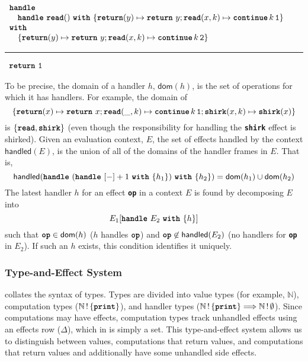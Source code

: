\begin{eff}
$\begin{array}{l}
  \textbf{\texttt{handle}} \\
  \quad \handleWith{\textbf{\texttt{read}}()}{\returnHandler{y}{\return{y}}; \textbf{\texttt{read}}(x, k) \mapsto {\continue{k}{\texttt{1}}}} \\
  \textbf{\texttt{with}} \\ 
  \quad \{ \returnHandler{y}{\return{y}}; \textbf{\texttt{read}}(x, k) \mapsto {\continue{k}{\texttt{2}}} \}
\end{array}$ 

\vspace{2mm} 
\textcolor{effComment}{\hrule height 0.2mm \relax}
\vspace{2mm} 

\textcolor{effComment}{$\begin{array}{l}\return{\texttt{1}}\end{array}$}
\end{eff}

To be precise, the domain of a handler $h$, $\textsf{dom}(h)$, is the set of operations for which it has handlers. For example, the domain of 
\[\{ \returnHandler{x}{\return{x}}; \textbf{\texttt{read}}(\_, k) \mapsto \continue{k}{\texttt{1}}; \textbf{\texttt{shirk}}(x, k) \mapsto \textbf{\texttt{shirk}}(x)
\} \] 
is $\{ \textbf{\texttt{read}}, \textbf{\texttt{shirk}} \}$ (even though the responsibility for handling the \textbf{\texttt{shirk}} effect is shirked).
Given an evaluation context, $E$, the set of effects handled by the context $\textsf{handled}(E)$, is the union of all of the domains of the handler frames in $E$. That is, 
\[\textsf{handled}(\handleWith{(\handleWith{[-]+1}{h_1})}{h_2}) = \textsf{dom}(h_1) \cup \textsf{dom}(h_2)\]
The latest handler $h$ for an effect \textbf{\texttt{op}} in a context $E$ is found by decomposing $E$ into 
\[E_1[\handleWith{E_2}{h}]\]
such that $\textbf{\texttt{op}} \in \textsf{dom}(h)$ ($h$ handles $\textbf{\texttt{op}}$) and $\textbf{\texttt{op}} \not\in \textsf{handled}(E_2)$ (no handlers for \textbf{\texttt{op}} in $E_2$). If such an $h$ exists, this condition identifies it uniquely. 
\subsubsection{Type-and-Effect System}
 collates the syntax of \efflang{} types. Types are divided into value types (for example, $\mathbb{N}$), computation types ($\effectType[\{\textbf{\texttt{print}} \}]{\mathbb{N}}$), and handler types ($\handlerType{\effectType[\{\textbf{\texttt{print}} \}]{\mathbb{N}}}{\effectType[\emptyset]{\mathbb{N}}}$). Since computations may have effects, computation types track unhandled effects using an effects row ($\Delta$), which in \efflang{} is simply a set. This type-and-effect system allows us to distinguish between values, computations that return values, and computations that return values and additionally have some unhandled side effects.


